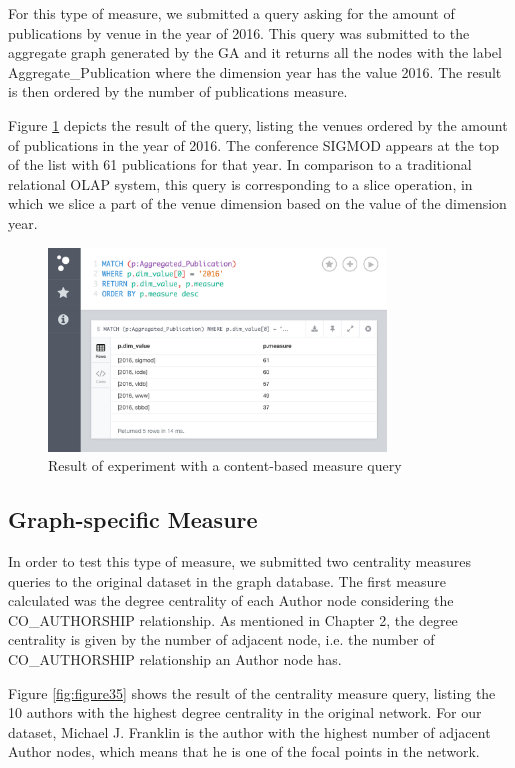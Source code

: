 For this type of measure, we submitted a query asking for the amount of publications by venue in the year of 2016. This query was submitted to the aggregate graph generated by the GA and it returns all the nodes with the label Aggregate\_Publication where the dimension year has the value 2016. The result is then ordered by the number of publications measure.

Figure \ref{fig:figure34} depicts the result of the query, listing the venues ordered by the amount of publications in the year of 2016. The conference SIGMOD appears at the top of the list with 61 publications for that year. In comparison to a traditional relational OLAP system, this query is corresponding to a slice operation, in which we slice a part of the venue dimension based on the value of the dimension year.

\begin{figure}[!h]
\centering
\includegraphics[width=0.8\textwidth]{../exp_content_measure.png}
\caption{Result of experiment with a content-based measure query}
\label{fig:figure34}
\end{figure}

\subsection{Graph-specific Measure}

In order to test this type of measure, we submitted two centrality measures queries to the original dataset in the graph database. The first measure calculated was the degree centrality of each Author node considering the CO\_AUTHORSHIP relationship. As mentioned in Chapter 2, the degree centrality is given by the number of adjacent node, i.e. the number of CO\_AUTHORSHIP relationship an Author node has.

Figure \ref{fig:figure35} shows the result of the centrality measure query, listing the 10 authors with the highest degree centrality in the original network. For our dataset, Michael J. Franklin is the author with the highest number of adjacent Author nodes, which means that he is one of the focal points in the network.

